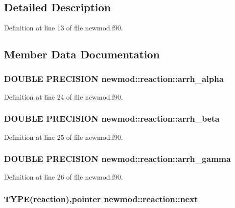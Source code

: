 \subsection{Detailed Description}


Definition at line 13 of file newmod.f90.

\subsection{Member Data Documentation}
\hypertarget{typenewmod_1_1reaction_ac2450a56db94410d51b2a2f0e200e9c7}{
\subsubsection[{arrh\_\-alpha}]{\setlength{\rightskip}{0pt plus 5cm}DOUBLE PRECISION {\bf newmod::reaction::arrh\_\-alpha}}}
\label{typenewmod_1_1reaction_ac2450a56db94410d51b2a2f0e200e9c7}


Definition at line 24 of file newmod.f90.\hypertarget{typenewmod_1_1reaction_a1a4a6b49bbda7af07ab04c808188f3c8}{
\subsubsection[{arrh\_\-beta}]{\setlength{\rightskip}{0pt plus 5cm}DOUBLE PRECISION {\bf newmod::reaction::arrh\_\-beta}}}
\label{typenewmod_1_1reaction_a1a4a6b49bbda7af07ab04c808188f3c8}


Definition at line 25 of file newmod.f90.\hypertarget{typenewmod_1_1reaction_aa44c1b0613b29996b884de4123970812}{
\subsubsection[{arrh\_\-gamma}]{\setlength{\rightskip}{0pt plus 5cm}DOUBLE PRECISION {\bf newmod::reaction::arrh\_\-gamma}}}
\label{typenewmod_1_1reaction_aa44c1b0613b29996b884de4123970812}


Definition at line 26 of file newmod.f90.\hypertarget{typenewmod_1_1reaction_a2089a8cc7dbe8a0e0c8883a67a7041dd}{
\subsubsection[{next}]{\setlength{\rightskip}{0pt plus 5cm}TYPE({\bf reaction}),pointer {\bf newmod::reaction::next}}}
\label{typenewmod_1_1reaction_a2089a8cc7dbe8a0e0c8883a67a7041dd}


